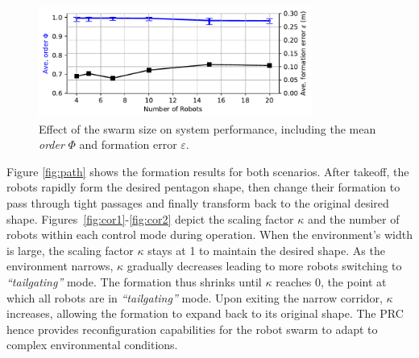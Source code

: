 \begin{figure}
    \centering
    \includegraphics[width=0.8\textwidth]{paper3/images/scalability.pdf}
    \caption{Effect of the swarm size on system performance, including the mean \textit{order} $\Phi$ and formation error $\varepsilon$.}
    \label{fig:scalability}
\end{figure}

Figure \ref{fig:path} shows the formation results for both scenarios. After takeoff, the robots rapidly form the desired pentagon shape, then change their formation to pass through tight passages and finally transform back to the original desired shape. Figures~\ref{fig:cor1}-\ref{fig:cor2} depict the scaling factor $\kappa$ and the number of robots within each control mode during operation. When the environment's width is large, the scaling factor $\kappa$ stays at 1 to maintain the desired shape. As the environment narrows, $\kappa$ gradually decreases leading to more robots switching to \textit{``tailgating''} mode. The formation thus shrinks until $\kappa$ reaches 0, the point at which all robots are in \textit{``tailgating''} mode. Upon exiting the narrow corridor, $\kappa$ increases, allowing the formation to expand back to its original shape. The PRC hence provides reconfiguration capabilities for the robot swarm to adapt to complex environmental conditions.

